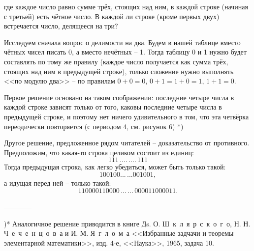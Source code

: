 где каждое число равно сумме трёх, стоящих над ним, в каждой строке (начиная с третьей) есть чётное число. В каждой ли строке (кроме первых двух) встречается число, делящееся на три?\par Исследуем сначала вопрос о делимости на два. Будем в нашей таблице вместо чётных чисел писать 0, а вместо нечётных -- 1. Тогда таблицу 0 и 1 нужно будет составлять по тому же правилу (каждое число получается как сумма трёх, стоящих над ним в предыдущей строке), только сложение нужно выполнять <<по модулю два>> -- по правилам $0+0=0$, $0+1 = 1+0 =1$, $1+1 = 0$. \par Первое решение основано на таком соображении: последние четыре числа в каждой строке зависят только от того, каковы последние четыре числа в предыдущей строке, и поэтому нет ничего удивительного в том, что эта четвёрка переодически повторяется (с периодом 4, см. рисунок 6) *)
\par Другое решение, предложенное рядом читателей -- доказательство от противного. Предположим, что какая-то строка целиком состоит из единиц: $$111{\,....\,....\,}111$$
Тогда предыдущая строка, как легко убедиться, может быть только такой:
$$100100{...\,...}001001{,}$$
а идущая перед ней -- только такой:
$$110000110000{\,...\,...\,}000011000011{.}$$
\\
------------
\par )* Аналогичное решение приводится в книге Дs. О. Ш~к~л~я~р~с~к~о~г~о, Н. Н. Ч~е~ч~е~н~ц~о~в~а и И. М. Я~г~л~о~м~а <<Избранные задчачи и теоремы элементарной математики>>, изд. 4-е, <<Наука>>, 1965, задача 10.